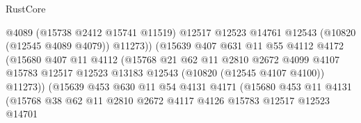 \begin{lexlean}{RustCore}
\begin{coremodule}
                                      @4089
                                      (@15738 @2412 @15741 @11519)
                                      @12517
                                      @12523
                                      @14761
                                      @12543
                                      (@10820 (@12545 @4089 @4079))
                                      @11273))
                                  (@15639
                                    @407
                                    @631
                                    @11
                                    @55
                                    @4112
                                    @4172
                                    (@15680
                                      @407
                                      @11
                                      @4112
                                      (@15768
                                        @21
                                        @62
                                        @11
                                        @2810
                                        @2672
                                        @4099
                                        @4107
                                        @15783
                                        @12517
                                        @12523
                                        @13183
                                        @12543
                                        (@10820 (@12545 @4107 @4100))
                                        @11273))
                                    (@15639
                                      @453
                                      @630
                                      @11
                                      @54
                                      @4131
                                      @4171
                                      (@15680
                                        @453
                                        @11
                                        @4131
                                        (@15768
                                          @38
                                          @62
                                          @11
                                          @2810
                                          @2672
                                          @4117
                                          @4126
                                          @15783
                                          @12517
                                          @12523
                                          @14701

\end{coremodule}
\end{lexlean}
